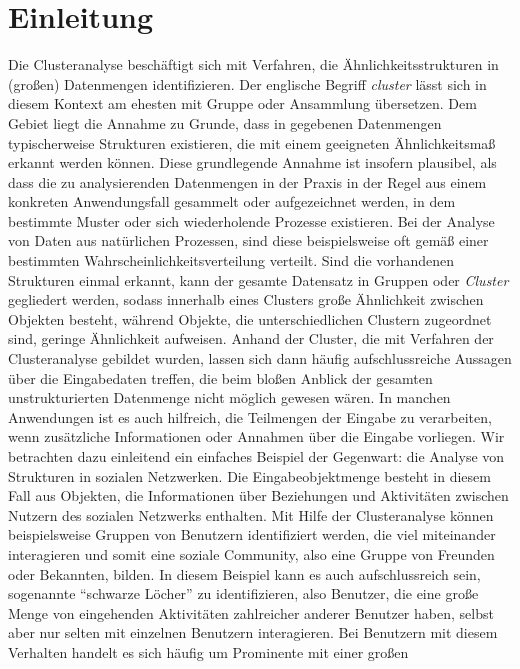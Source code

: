 \section{Einleitung}

Die Clusteranalyse beschäftigt sich mit Verfahren, die Ähnlichkeitsstrukturen in (großen) Datenmengen identifizieren. Der englische
Begriff \emph{cluster} lässt sich in diesem Kontext am ehesten mit Gruppe oder Ansammlung übersetzen. Dem Gebiet liegt die
Annahme zu Grunde, dass in gegebenen Datenmengen typischerweise Strukturen existieren, die mit einem geeigneten Ähnlichkeitsmaß
erkannt werden können. Diese grundlegende Annahme ist insofern plausibel, als dass die zu analysierenden Datenmengen in der Praxis
in der Regel aus einem konkreten Anwendungsfall gesammelt oder aufgezeichnet werden, in dem bestimmte Muster oder sich wiederholende
Prozesse existieren. Bei der Analyse von Daten aus natürlichen Prozessen, sind diese beispielsweise oft gemäß einer bestimmten
Wahrscheinlichkeitsverteilung verteilt.
Sind die vorhandenen Strukturen einmal erkannt, kann der gesamte Datensatz in Gruppen oder \emph{Cluster}
gegliedert werden, sodass innerhalb eines Clusters große Ähnlichkeit zwischen Objekten besteht, während Objekte, die
unterschiedlichen Clustern zugeordnet sind, geringe Ähnlichkeit aufweisen. Anhand der Cluster, die mit Verfahren der Clusteranalyse
gebildet wurden, lassen sich dann häufig aufschlussreiche Aussagen über die Eingabedaten treffen, die beim bloßen Anblick der
gesamten unstrukturierten Datenmenge nicht möglich gewesen wären. In manchen Anwendungen ist es auch hilfreich, die Teilmengen
der Eingabe zu verarbeiten, wenn zusätzliche Informationen oder Annahmen über die Eingabe vorliegen.
\absatz
Wir betrachten dazu einleitend ein einfaches Beispiel der Gegenwart: die Analyse von Strukturen in sozialen Netzwerken.
Die Eingabeobjektmenge besteht in diesem Fall aus Objekten, die Informationen über Beziehungen und Aktivitäten zwischen
Nutzern des sozialen Netzwerks enthalten. Mit Hilfe der Clusteranalyse können beispielsweise Gruppen von Benutzern
identifiziert werden, die viel miteinander interagieren und somit eine soziale Community, also eine Gruppe von Freunden
oder Bekannten, bilden. In diesem Beispiel kann es auch aufschlussreich sein, sogenannte "`schwarze Löcher"' zu identifizieren,
also Benutzer, die eine große Menge von eingehenden Aktivitäten zahlreicher anderer Benutzer haben, selbst aber nur selten
mit einzelnen Benutzern interagieren. Bei Benutzern mit diesem Verhalten handelt es sich häufig um Prominente mit einer großen
